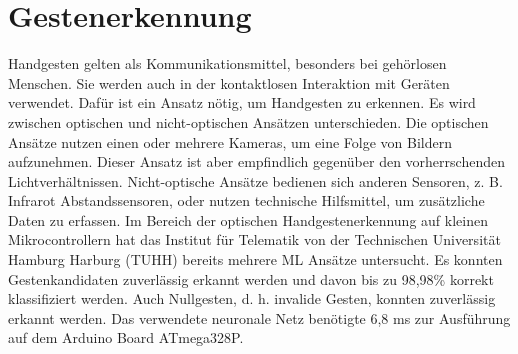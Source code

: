 \chapter{Gestenerkennung}
Handgesten gelten als Kommunikationsmittel, besonders bei gehörlosen Menschen. Sie werden auch in der kontaktlosen Interaktion mit Geräten verwendet. Dafür ist ein Ansatz nötig, um Handgesten
zu erkennen. Es wird zwischen optischen und nicht-optischen Ansätzen unterschieden. Die optischen Ansätze nutzen einen
oder mehrere Kameras, um eine Folge von Bildern aufzunehmen. Dieser Ansatz ist aber empfindlich gegenüber den vorherrschenden Lichtverhältnissen.
Nicht-optische Ansätze bedienen sich anderen Sensoren, z. B. Infrarot Abstandssensoren, oder nutzen technische Hilfsmittel, um zusätzliche Daten zu erfassen.
\newline
\newline
Im Bereich der optischen Handgestenerkennung auf kleinen Mikrocontrollern hat das Institut für Telematik von der Technischen Universität Hamburg Harburg (TUHH) bereits mehrere ML Ansätze untersucht.
Es konnten Gestenkandidaten zuverlässig erkannt werden und davon bis zu 98,98\% korrekt klassifiziert werden. Auch Nullgesten, d. h. invalide Gesten, konnten zuverlässig erkannt werden. Das verwendete neuronale Netz
benötigte 6,8 ms zur Ausführung auf dem Arduino Board ATmega328P.


